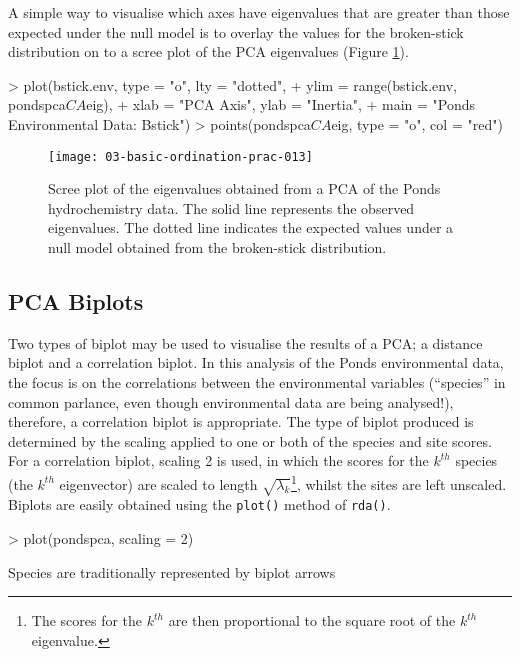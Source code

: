 \documentclass[a4paper,10pt]{article}
\newcommand{\rda}{\texttt{rda()}\xspace}
\begin{document}
A simple way to visualise which axes have eigenvalues that are greater than those expected under the null model is to overlay the values for the broken-stick distribution on to a scree plot of the PCA eigenvalues (Figure \ref{bstick}).

\begin{Schunk}
\begin{Sinput}
> plot(bstick.env, type = "o", lty = "dotted",
+      ylim = range(bstick.env, pondspca$CA$eig),
+      xlab = "PCA Axis", ylab = "Inertia",
+      main = "Ponds Environmental Data: Bstick")
> points(pondspca$CA$eig, type = "o", col = "red")
\end{Sinput}
\end{Schunk}
\begin{figure}[t]
\begin{center}
\texttt{[image: 03-basic-ordination-prac-013]}
\caption{\label{bstick}Scree plot of the eigenvalues obtained from a PCA of the Ponds hydrochemistry data. The solid line represents the observed eigenvalues. The dotted line indicates the expected values under a null model obtained from the broken-stick distribution.}
\end{center}
\end{figure}

\subsection{PCA Biplots}
Two types of biplot may be used to visualise the results of a PCA; a distance biplot and a correlation biplot. In this analysis of the Ponds environmental data, the focus is on the correlations between the environmental variables (``species'' in common parlance, even though environmental data are being analysed!), therefore, a correlation biplot is appropriate. The type of biplot produced is determined by the scaling applied to one or both of the species and site scores. For a correlation biplot, scaling 2 is used, in which the scores for the $k^{th}$ species (the $k^{th}$ eigenvector) are scaled to length $\sqrt{\lambda_k}$\footnote{The scores for the $k^{th}$ are then proportional to the square root of the $k^{th}$ eigenvalue.}, whilst the sites are left unscaled. Biplots are easily obtained using the \texttt{plot()} method of \rda.
\begin{Schunk}
\begin{Sinput}
> plot(pondspca, scaling = 2)
\end{Sinput}
\end{Schunk}
Species are traditionally represented by biplot arrows
\begin{Schunk}
\end{Schunk}
\end{document}
